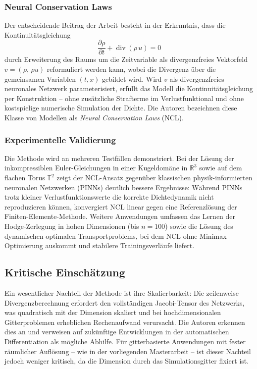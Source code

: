 \documentclass[a4paper,12pt]{article}
\begin{document}
\subsubsection*{Neural Conservation Laws}

Der entscheidende Beitrag der Arbeit besteht in der Erkenntnis, dass die Kontinuit\"atsgleichung
\[
    \frac{\partial \rho}{\partial t} + \operatorname{div}(\rho\, u) = 0
\]
durch Erweiterung des Raums um die Zeitvariable als divergenzfreies Vektorfeld
$v = (\rho,\, \rho u)$ reformuliert werden kann, wobei die Divergenz \"uber die gemeinsamen
Variablen $(t, x)$ gebildet wird. Wird $v$ als divergenzfreies neuronales Netzwerk
parameterisiert, erf\"ullt das Modell die Kontinuit\"atsgleichung per Konstruktion -- ohne
zus\"atzliche Strafterme im Verlustfunktional und ohne kostspielige numerische Simulation der
Dichte. Die Autoren bezeichnen diese Klasse von Modellen als \emph{Neural Conservation Laws}
(NCL).

\subsubsection*{Experimentelle Validierung}

Die Methode wird an mehreren Testf\"allen demonstriert. Bei der L\"osung der inkompressiblen
Euler-Gleichungen in einer Kugeldom\"ane in $\mathbb{R}^3$ sowie auf dem flachen Torus $\mathbb{T}^2$
zeigt der NCL-Ansatz gegen\"uber klassischen physik-informierten neuronalen Netzwerken (PINNs)
deutlich bessere Ergebnisse: W\"ahrend PINNs trotz kleiner Verlustfunktionswerte die korrekte
Dichtedynamik nicht reproduzieren k\"onnen, konvergiert NCL linear gegen eine Referenzl\"osung
der Finiten-Elemente-Methode. Weitere Anwendungen umfassen das Lernen der Hodge-Zerlegung in
hohen Dimensionen (bis $n = 100$) sowie die L\"osung des dynamischen optimalen Transportproblems,
bei dem NCL ohne Minimax-Optimierung auskommt und stabilere Trainingsverl\"aufe liefert.

\subsection*{Kritische Einsch\"atzung}

Ein wesentlicher Nachteil der Methode ist ihre Skalierbarkeit: Die zeilenweise Divergenzberechnung
erfordert den vollst\"andigen Jacobi-Tensor des Netzwerks, was quadratisch mit der Dimension skaliert
und bei hochdimensionalen Gitterproblemen erheblichen Rechenaufwand verursacht. Die Autoren
erkennen dies an und verweisen auf zuk\"unftige Entwicklungen in der automatischen Differentiation als
m\"ogliche Abhilfe. F\"ur gitterbasierte Anwendungen mit fester r\"aumlicher Aufl\"osung -- wie in
der vorliegenden Masterarbeit -- ist dieser Nachteil jedoch weniger kritisch, da die Dimension durch
das Simulationsgitter fixiert ist.
\end{document}
